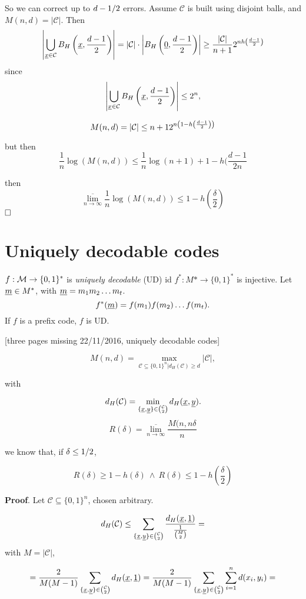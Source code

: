 So we can correct up to ${d-1}/{2}$ errors. Assume $\mathcal{C}$ is built using disjoint balls, and $M(n, d) = |\mathcal{C}|$. Then
\[
\left|\bigcup_{\underline{x}\in\mathcal{C}}B_H\left(\underline{x}, \dfrac{d-1}{2}\right)\right| = |\mathcal{C}|\cdot \left|B_H\left(\underline{0}, \dfrac{d-1}{2}\right)\right| \geq \dfrac{|\mathcal{C}|}{n+1}2^{nh\left(\frac{d-1}{2}\right)}
\]
since 
\[
 \left|\bigcup_{\underline{x}\in\mathcal{C}}B_H\left(\underline{x}, \dfrac{d-1}{2}\right)\right| \leq 2^n,
\]

\[
 M(n, d) = |\mathcal{C}| \leq n+1 2^{n\left(1-h\left(\frac{d-1}{2}\right)\right)}
\]

but then
\[
 \dfrac{1}{n} \log(M(n, d)) \leq \dfrac{1}{n}\log(n+1) + 1 -h(\dfrac{d-1}{2n}
\]

then
\[
 \overline{\lim_{n\rightarrow \infty}}\dfrac{1}{n}\log(M(n, d)) \leq 1 - h\left(\dfrac{\delta}{2}\right)
\]
$\hfill\Box$

\section{Uniquely decodable codes}
$f:\mathcal{M} \rightarrow \{0, 1\}^*$ is \emph{uniquely decodable} (UD) id $f^*:M*\rightarrow \{0,1\}^*$ is injective. Let $\underline{m} \in M^*$, with $\underline{m} = m_1m_2\ldots m_t$.
\[
 f^*(\underline{m}) = f(m_1)f(m_2)\ldots f(m_t).
\]
If $f$ is a prefix code, $f$ is UD.


[three pages missing 22/11/2016, uniquely decodable codes]

\[M(n, d) = \max_{\mathcal{C} \subseteq\{0, 1\}^n | d_H(\mathcal{C}) \geq d}|\mathcal{C}|,\]

with

\[
 d_H(\mathcal{C}) = \min_{\{\underline{x}, \underline{y}\}\in\binom{\mathcal{C}}{2}}d_H(\underline{x}, \underline{y}).
\]
\[
 R(\delta) = \overline{\lim_{n \rightarrow \infty}}\dfrac{M(n, n\delta}{n}
\]

we know that, if $\delta \leq {1}/{2}$,

$$ R(\delta) \geq 1 - h(\delta)\ \wedge\ R(\delta) \leq 1 - h(\dfrac{\delta}{2})$$

\noindent\textbf{Proof}. Let $\mathcal{C} \subseteq \{0, 1\}^n$, chosen arbitrary.

\[
 d_H(\mathcal{C}) \leq \sum_{\{\underline{x}, \underline{y}\}\in \binom{\mathcal{C}}{2}} \dfrac{d_H(\underline{x}, \underline{1})}{\frac{1}{\binom{M}{2}}} =
\]
with $M = |\mathcal{C}|$,

\[
 = \dfrac{2}{M(M-1)}\sum_{\{\underline{x}, \underline{y}\} \in \binom{\mathcal{C}}{2}} d_H(\underline{x},\underline{1})= \dfrac{2}{M(M-1)}\sum_{\{\underline{x}, \underline{y}\} \in \binom{\mathcal{C}}{2}} \sum_{i=1}^n d(x_i, y_i) = 
\]

